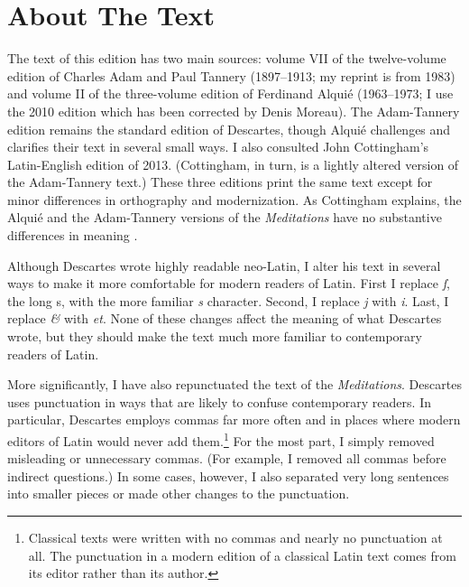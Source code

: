 \section*{About The Text}

The text of this edition has two main sources: volume VII of the twelve-volume edition of Charles Adam and Paul Tannery (1897--1913; my reprint is from 1983) and volume II of the three-volume edition of Ferdinand Alquié (1963--1973; I use the 2010 edition which has been corrected by Denis Moreau). The Adam-Tannery edition remains the standard edition of Descartes, though Alquié challenges and clarifies their text in several small ways. I also consulted John Cottingham's Latin-English edition of 2013. (Cottingham, in turn, is a lightly altered version of the Adam-Tannery text.) These three editions print the same text except for minor differences in orthography and modernization. As Cottingham explains, the Alquié and the Adam-Tannery versions of the \textit{Meditations} have no substantive differences in meaning \parencite[xxxii, footnote 5]{cottingham2013}.

Although Descartes wrote highly readable neo-Latin, I alter his text in several ways to make it more comfortable for modern readers of Latin. First I replace  \textit{ſ}, the long s, with the more familiar \textit{s} character. Second, I replace \textit{j} with \textit{i}. Last, I replace \textit{\&} with \textit{et}. None of these changes affect the meaning of what Descartes wrote, but they should make the text much more familiar to contemporary readers of Latin.

More significantly, I have also repunctuated the text of the \textit{Meditations}. Descartes uses punctuation in ways that are likely to confuse contemporary readers. In particular, Descartes employs commas far more often and in places where modern editors of Latin would never add them.\footnote{Classical texts were written with no commas and nearly no punctuation at all. The punctuation in a modern edition of a classical Latin text comes from its editor rather than its author.} For the most part, I simply removed misleading or unnecessary commas. (For example, I removed all commas before indirect questions.) In some cases, however, I also separated very long sentences into smaller pieces or made other changes to the punctuation.

